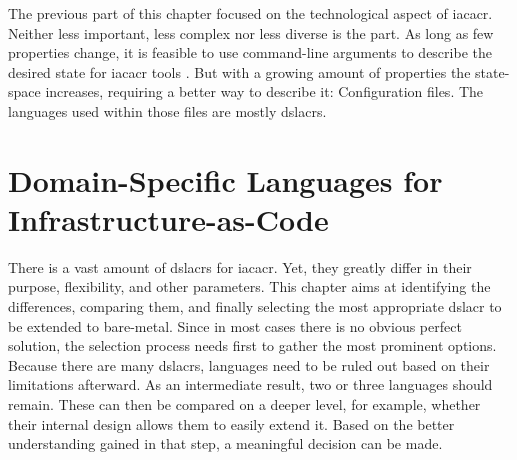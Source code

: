 \newline\smallskip
The previous part of this chapter focused on the technological  aspect of \gls{iacacr}. Neither less important, less complex nor less diverse is the  part.
\newline
As long as few properties change, it is feasible to use command-line arguments to describe the desired state for \gls{iacacr} tools \cite{iac_oreilly}. But with a growing amount of properties the state-space increases, requiring a better way to describe it: Configuration files. The languages used within those files are mostly \gls{dslacr}s.

\section{Domain-Specific Languages for Infrastructure-as-Code} %
There is a vast amount of \gls{dslacr}s for \gls{iacacr}. Yet, they greatly differ in their purpose, flexibility, and other parameters. This chapter aims at identifying the differences, comparing them, and finally selecting the most appropriate \gls{dslacr} to be extended to bare-metal.
\newline
Since in most cases there is no obvious perfect solution, the selection process needs first to gather the most prominent options. Because there are many \gls{dslacr}s, languages need to be ruled out based on their limitations afterward. As an intermediate result, two or three languages should remain. These can then be compared on a deeper level, for example, whether their internal design allows them to easily extend it. Based on the better understanding gained in that step, a meaningful decision can be made.

